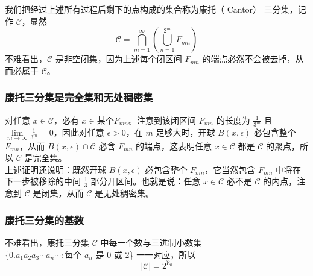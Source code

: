 \documentclass{ctexbook}
\begin{document}
\begin{figure}[h]
\end{figure}

我们把经过上述所有过程后剩下的点构成的集合称为康托（ Cantor） 三分集，记作 $\mathcal{C}$，显然
\[
\mathcal{C} = \bigcap_{m=1}^\infty\left(\bigcup_{n=1}^{2^m}F_{mn}\right)
\]
不难看出，$\mathcal{C}$ 是非空闭集，因为上述每个闭区间 $F_{mn}$ 的端点必然不会被去掉，从而必属于 $\mathcal{C}$。\\

\subsubsection{康托三分集是完全集和无处稠密集}

对任意 $x \in \mathcal{C}$，必有 $x\in \mbox{某个} F_{mn}$。注意到该闭区间 $F_{mn}$ 的长度为 $\frac{1}{3^m}$ 且 $\lim\limits_{m\to\infty}\frac{1}{3^m}=0$，因此对任意 $\epsilon > 0$，在 $m$ 足够大时，开球 $B(x,\epsilon)$ 必包含整个 $F_{mn}$，从而 $B(x,\epsilon)\cap \mathcal{C}$ 必含 $F_{mn}$ 的端点，这表明任意 $x \in \mathcal{C}$ 都是 $\mathcal{C}$ 的聚点，所以 $\mathcal{C}$ 是完全集。 \\

上述证明还说明：既然开球 $B(x,\epsilon)$ 必包含整个 $F_{mn}$，它当然包含 $F_{mn}$ 中将在下一步被移除的中间 $\frac 13$ 部分开区间。也就是说：任意 $x \in \mathcal{C}$ 必不是 $\mathcal{C}$ 的内点，注意到 $\mathcal{C}$ 是闭集，从而 $\mathcal{C}$ 是无处稠密集。
 
\subsubsection{康托三分集的基数}

不难看出，康托三分集 $\mathcal{C}$ 中每一个数与三进制小数集 $\{0.a_1a_2a_3\cdots a_n\cdots: \mbox{每个 $a_n$ 是 $0$ 或 $2$}$\} 一一对应，所以
\[
\lvert \mathcal{C}\rvert = 2^{\aleph_0}
\]
\end{document}
